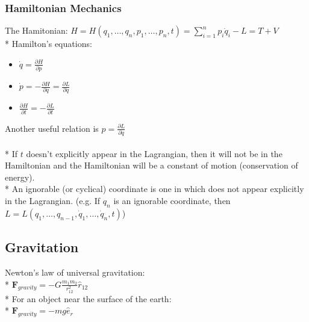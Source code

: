 \subsubsection{Hamiltonian Mechanics}
The Hamitonian: \(H=H(q_1,\ldots,q_n,p_1,\ldots,p_n,t)= \sum_{i=1}^{n} p_i\dot{q}_i-L=T+V\)\\*
Hamilton's equations:
\begin{itemize}
\item \(\displaystyle\dot{q}=\frac{\partial H}{\partial p}\)
\item \(\displaystyle\dot{p}=-\frac{\partial H}{\partial q}=\frac{\partial L}{\partial q}\)
\item \(\displaystyle\frac{\partial H}{\partial t}=-\frac{\partial L}{\partial t}\)
\end{itemize}
Another useful relation is \(p=\frac{\partial L}{\partial \dot{q}}\)\\\\*
If \(t\) doesn't explicitly appear in the Lagrangian, then it will not be in the Hamiltonian and the Hamiltonian will be a constant of motion (conservation of energy).\\*
An ignorable (or cyclical) coordinate is one in which does not appear explicitly in the Lagrangian. (e.g. If \(q_n\) is an ignorable coordinate, then \(L=L(q_1,\ldots,q_{n-1},\dot{q}_1,\ldots,\dot{q}_n,t)\))

\subsection{Gravitation}
Newton's law of universal gravitation:\\*
\(\displaystyle\mathbf{F}_{gravity}=-G\frac{m_1m_2}{r_{12}^2}\hat{r}_{12}\)\\*
For an object near the surface of the earth:\\*
\(\mathbf{F}_{gravity}=-mg\hat{e}_r\)

